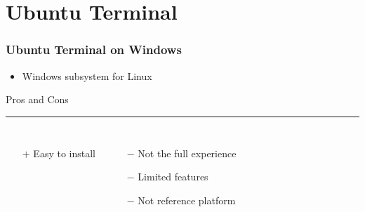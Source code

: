 \section{Ubuntu Terminal}
\begin{frame}
	\frametitle{Ubuntu Terminal on Windows}
	
	\begin{itemize}
		\item Windows subsystem for Linux
	\end{itemize}
	\vspace{0.5cm}
	
	Pros and Cons \vspace{0.1cm}
	\hrule 
	\begin{columns}[t]
		\begin{enumerate}
			\item[$+$] Easy to install
		\end{enumerate}
		\begin{enumerate}
			\item[$-$] Not the full experience
			\item[$-$] Limited features
			\item[$-$] Not reference platform
		\end{enumerate}
	\end{columns} \vspace{0.5cm}
	
	\begin{itemize}
		\item[] 
		\item[] 
	\end{itemize}
	
\end{frame}

